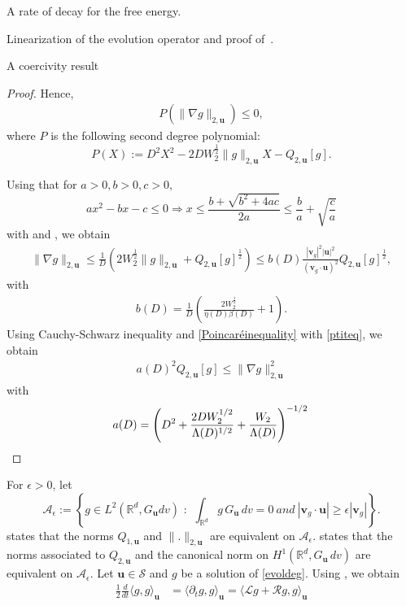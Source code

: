 \documentclass[reqno]{amsart} %
\begin{document}
\begin{section}{A rate of decay for the free energy.}
\begin{section}{Linearization of the evolution operator and proof of~\texorpdfstring{}{thm3}.}
\begin{subsection}{A coercivity result}
\begin{proof}
Hence, 
\begin{align*}
    P\left(\lVert \nabla g \rVert_{2,\mathbf{u}}\right) \leq 0,
\end{align*}
where $P $ is the following second degree polynomial:
$$P(X):= D^2X^2-2DW_2^{\frac{1}{2}}\lVert g \rVert_{2,\mathbf{u}}X-Q_{2,\mathbf{u}}[g].$$


Using that for $a>0,b>0,c>0, $
$$ a x^{2}-b x-c \leq 0 \Rightarrow x \leq \frac{b+\sqrt{b^{2}+4 a c}}{2 a} \leq \frac{b}{a}+\sqrt{\frac{c}{a}}
$$
with  and , we obtain
\begin{align*}
   \lVert \nabla g \rVert_{2,\mathbf{u}}\leq \frac{1}{D}  \left(2W_2^{\frac{1}{2}}\lVert g \rVert_{2,\mathbf{u}}+Q_{2,\mathbf{u}}[g]^{\frac{1}{2}} \right) \leq b(D) \frac{|\mathbf{v}_g|^2|\mathbf{u}|^2}{(\mathbf{v}_g \cdot \mathbf{u})^2}Q_{2,\mathbf{u}}[g]^{\frac{1}{2}},
\end{align*}
with \begin{align*}
    b(D)=\frac{1}{D}  \left(\frac{2 W_2^{\frac{1}{2}}}{\eta(D) \beta(D)}+1\right).
\end{align*}
Using Cauchy-Schwarz inequality and \eqref{Poincaréinequality} with \eqref{ptiteq}, we obtain 
\begin{align}
    a(D)^2 Q_{2,\mathbf{u}}[g]\leq  \lVert \nabla g \rVert_{2,\mathbf{u}}^2
\end{align} 
with 
\begin{equation*}
    a(D) = \left(D^2 + \frac{2D W_2^{1/2}}{\Lambda(D)^{1/2}} + \frac{W_2}{\Lambda(D)} \right)^{-1/2} \qedhere
\end{equation*}
\end{proof}
For $\epsilon>0$, let 
$$\mathcal{A}_{\epsilon}:= \left\{ g \in L^2(\mathbb{R}^d,G_\mathbf{u}dv) \text{ : } \ \int_{\mathbb{R}^d}g\,G_\mathbf{u}\,dv=0 \ and \  |\mathbf{v}_g \cdot \mathbf{u}| \geq \epsilon |\mathbf{v}_g| \right\}.$$ 
 states that the norms $Q_{1,\mathbf{u}}$ and $\lVert . \rVert_{2,\mathbf{u}}$  are equivalent on $\mathcal{A}_{\epsilon}$.  states that the norms associated to $Q_{2,\mathbf{u}}$ and the canonical norm on $H^1(\mathbb{R}^d,G_\mathbf{u}\,dv)$ are equivalent on $\mathcal{A}_{\epsilon}$.
Let $\mathbf{u}\in \mathcal{S}$ and $g $ be a solution of \eqref{evoldeg}.
Using  , we obtain
\begin{align}
\label{derivéPS}
    \frac{1}{2}\frac{d}{dt}\langle g,g\rangle_{\mathbf{u}}&=\langle  \partial_t g,g\rangle_{\mathbf{u}} 
    = \langle \mathcal{L}g+ \mathcal{R}g,g\rangle_{\mathbf{u}} 

\end{align}
\end{subsection}
\end{section}
\end{section}
\end{document}
